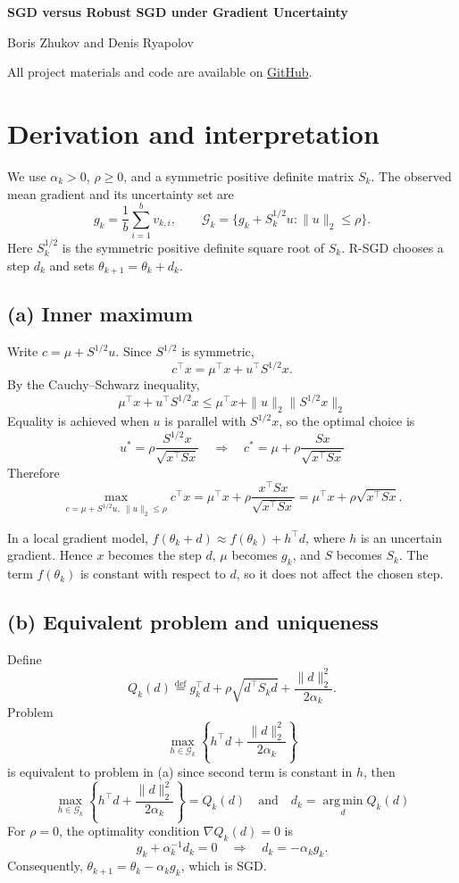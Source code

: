 \documentclass[11pt,a4paper]{article}
\def\eqdef{\overset{\mathrm{def}}{=}}
\begin{document}
\begin{center}
    \textbf{SGD versus Robust SGD under Gradient Uncertainty}

    Boris Zhukov and Denis Ryapolov

    All project materials and code are available on
    \href{https://github.com/podmabsterio/SGD-vs-RSGD-under-Gradient-Uncertaint/tree/main}{GitHub}.
\end{center}

\section{Derivation and interpretation}
\label{sec:derivation}

We use $\alpha_k>0$, $\rho\geq 0$, and a symmetric positive definite
matrix $S_k$. The observed mean gradient and its uncertainty set are
\[
    g_k=\frac{1}{b}\sum_{i=1}^{b}v_{k,i},
    \qquad
    \mathcal G_k=\{g_k+S_k^{1/2}u:\|u\|_2\leq\rho\}.
\]
Here $S_k^{1/2}$ is the symmetric positive definite square root of $S_k$.
R-SGD chooses a step $d_k$ and sets $\theta_{k+1}=\theta_k+d_k$.

\subsection*{(a) Inner maximum}

Write $c=\mu+S^{1/2}u$. Since $S^{1/2}$ is symmetric,
\[
    c^\top x=\mu^\top x+u^\top S^{1/2}x.
\]
By the Cauchy--Schwarz inequality,
\[
    \mu^\top x+u^\top S^{1/2}x
    \leq \mu^\top x + \|u\|_2\|S^{1/2}x\|_2
\]
Equality is achieved when $u$ is parallel with $S^{1/2}x$, so the optimal choice is 
\[
    u^*=\rho\frac{S^{1/2}x}{\sqrt{x^\top Sx}}
    \quad \Longrightarrow \quad
    c^*=\mu + \rho\frac{Sx}{\sqrt{x^\top Sx}}
\]
Therefore
\[
    \max_{c=\mu+S^{1/2}u,\ \|u\|_2\leq\rho}c^\top x
    =\mu^\top x + \rho\frac{x^\top Sx}{\sqrt{x^\top Sx}} = \mu^\top x + \rho\sqrt{x^\top Sx}.
\]

In a local gradient model,
$f(\theta_k+d)\approx f(\theta_k)+h^\top d$, where $h$ is an uncertain
gradient. Hence $x$ becomes the step $d$, $\mu$ becomes $g_k$,
and $S$ becomes $S_k$. The term $f(\theta_k)$ is constant with respect
to $d$, so it does not affect the chosen step.

\subsection*{(b) Equivalent problem and uniqueness}
Define
\begin{equation}
Q_k(d) \eqdef g_k^\top d+\rho\sqrt{d^\top S_kd} +\frac{\|d\|_2^2}{2\alpha_k}.
\label{eq:robust}
\end{equation}
Problem 
\[
\max_{h \in \mathcal G_k} \left\{h^\top d +\frac{\|d\|_2^2}{2\alpha_k}\right\}
\]
is equivalent to problem in (a) since second term is constant in $h$, then
\[
\max_{h \in \mathcal G_k} \left\{h^\top d +\frac{\|d\|_2^2}{2\alpha_k}\right\} = Q_k(d) \quad \text{and} \quad d_k=\operatorname*{arg\,min}_{d} Q_k(d)
\]
For $\rho=0$, the optimality condition $\nabla Q_k(d) = 0$ is
\[
    g_k+\alpha_k^{-1}d_k=0 
    \quad \Longrightarrow \quad
    d_k=-\alpha_k g_k.
\]
Consequently, $\theta_{k+1}=\theta_k-\alpha_k g_k$, which is SGD.
\end{document}
